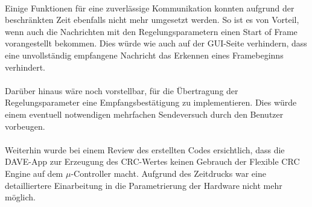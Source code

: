 \paragraph{}
Einige Funktionen für eine zuverlässige Kommunikation konnten aufgrund der beschränkten Zeit ebenfalls nicht mehr umgesetzt werden. So ist es von Vorteil, wenn auch die Nachrichten mit den Regelungsparametern einen Start of Frame vorangestellt bekommen. Dies würde wie auch auf der GUI-Seite verhindern, dass eine unvollständig empfangene Nachricht das Erkennen eines Framebeginns verhindert.
\paragraph{}
Darüber hinaus wäre noch vorstellbar, für die Übertragung der Regelungsparameter eine Empfangsbestätigung zu implementieren. Dies würde einem eventuell notwendigen mehrfachen Sendeversuch durch den Benutzer vorbeugen.
\paragraph{}
Weiterhin wurde bei einem Review des erstellten Codes ersichtlich, dass die DAVE-App zur Erzeugung des CRC-Wertes keinen Gebrauch der Flexible CRC Engine auf dem $\mu$-Controller macht. Aufgrund des Zeitdrucks war eine detailliertere Einarbeitung in die Parametrierung der Hardware nicht mehr möglich.
